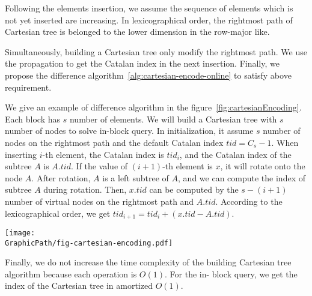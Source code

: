 Following the elements insertion, we assume the sequence of elements
which is not yet inserted are increasing.  In lexicographical order,
the rightmost path of Cartesian tree is belonged to the lower
dimension in the row-major like.

Simultaneously, building a Cartesian tree only modify the rightmost
path.  We use the propagation to get the Catalan index in the next
insertion.  Finally, we propose the difference
algorithm~\ref{alg:cartesian-encode-online} to satisfy above
requirement.

\iffalse 為了解決在線詢問操作，取 $s = \frac{\log n}{4}$。根據字典順序
的編碼性質，一開始建立虛設點 $s$ 個在右鏈上，其樹編號 $\mathit{tid} =
C_s - 1$ 。隨著插入元素的增加，尚未加入的元素都預設嚴格遞減，加上根據
編碼順序，我們藉由差值來維護在線編碼 (如圖
~\ref{fig:cartesianEncoding})。根據上述的編碼想法，我們得到算法
~\ref{alg:cartesian-encode-online}。\fi

We give an example of difference algorithm in the
figure~\ref{fig:cartesianEncoding}.  Each block has $s$ number of
elements.  We will build a Cartesian tree with $s$ number of nodes to
solve in-block query.  In initialization, it assume $s$ number of
nodes on the rightmost path and the default Catalan index
$\mathit{tid} = C_s - 1$.  When inserting $i$-th element, the Catalan
index is $\mathit{tid}_i$, and the Catalan index of the subtree $A$ is
$A.\mathit{tid}$.  If the value of $(i+1)$-th element is $x$, it will
rotate onto the node $A$.  After rotation, $A$ is a left subtree of
$A$, and we can compute the index of subtree $A$ during rotation.
Then, $x.\mathit{tid}$ can be computed by the $s-(i+1)$ number of
virtual nodes on the rightmost path and $A.\mathit{tid}$.  According
to the lexicographical order, we get $\mathit{tid}_{i+1} =
\mathit{tid}_i + (x.\mathit{tid} - A.\mathit{tid})$.



\begin{figure*}[!thb]
  \centering
  \texttt{[image: \\GraphicPath/fig-cartesian-encoding.pdf]}

  \caption{An example for difference algorithm to encode Cartesian tree.}

  \label{fig:cartesianEncoding}
\end{figure*}

Finally, we do not increase the time complexity of the building
Cartesian tree algorithm because each operation is $O(1)$.  For the in-
block query, we get the index of the Cartesian tree in amortized $O(1)$.

\iffalse
最後，我們不改變原本的建立笛卡爾樹算法，便能在過程中擭得樹的編號，
每一次的 in-block 詢問只需要一次記憶體存取，得到任一操作攤銷複雜度 $\theta(1)$。
\fi
